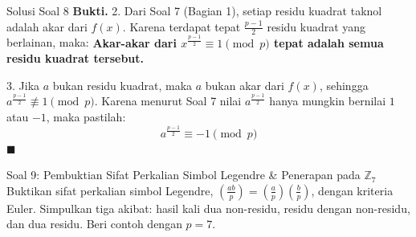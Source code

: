 \documentclass[11pt,a4paper]{article}
\newenvironment{proof}{\noindent\textbf{Bukti.}}{\hfill$\blacksquare$\vspace{0.2em}}
\begin{document}
\begin{solusibox}{Solusi Soal 8}
\begin{proof}
2. Dari Soal 7 (Bagian 1), setiap residu kuadrat taknol adalah akar dari $f(x)$. Karena terdapat tepat $\frac{p-1}{2}$ residu kuadrat yang berlainan, maka:  
\textbf{Akar-akar dari $x^{\frac{p-1}{2}} \equiv 1 \pmod p$ tepat adalah semua residu kuadrat tersebut.}

3. Jika $a$ bukan residu kuadrat, maka $a$ bukan akar dari $f(x)$, sehingga $a^{\frac{p-1}{2}} \not\equiv 1 \pmod p$.  
Karena menurut Soal 7 nilai $a^{\frac{p-1}{2}}$ hanya mungkin bernilai $1$ atau $-1$, maka pastilah:
\[
a^{\frac{p-1}{2}} \equiv -1 \pmod p
\]
\end{proof}
\end{solusibox}

\newpage

\begin{soalbox}{Soal 9: Pembuktian Sifat Perkalian Simbol Legendre \& Penerapan pada $\mathbb{Z}_7$}
Buktikan sifat perkalian simbol Legendre, $\left(\frac{ab}{p}\right) = \left(\frac{a}{p}\right)\left(\frac{b}{p}\right)$, dengan kriteria Euler. Simpulkan tiga akibat: hasil kali dua non-residu, residu dengan non-residu, dan dua residu. Beri contoh dengan $p = 7$.
\end{soalbox}
\end{document}
